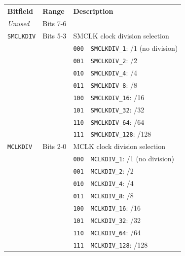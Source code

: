 \begin{tabularx}{\textwidth}{ l l l X }
\textbf{Bitfield} & \textbf{Range} & \multicolumn{2}{X}{\textbf{Description}} \\ \hline
\textit{Unused} & Bits 7-6 & \multicolumn{2}{X}{} \\
\hline
\texttt{SMCLKDIV} & Bits 5-3 & \multicolumn{2}{X}{SMCLK clock division selection} \\
 & & \texttt{000} & \texttt{SMCLKDIV\_1}: /1 (no division) \\
 & & \cellcolor{tablehighlightcolor}\texttt{001} & \cellcolor{tablehighlightcolor}\texttt{SMCLKDIV\_2}: /2 \\
 & & \texttt{010} & \texttt{SMCLKDIV\_4}: /4 \\
 & & \cellcolor{tablehighlightcolor}\texttt{011} & \cellcolor{tablehighlightcolor}\texttt{SMCLKDIV\_8}: /8 \\
 & & \texttt{100} & \texttt{SMCLKDIV\_16}: /16 \\
 & & \cellcolor{tablehighlightcolor}\texttt{101} & \cellcolor{tablehighlightcolor}\texttt{SMCLKDIV\_32}: /32 \\
 & & \texttt{110} & \texttt{SMCLKDIV\_64}: /64 \\
 & & \cellcolor{tablehighlightcolor}\texttt{111} & \cellcolor{tablehighlightcolor}\texttt{SMCLKDIV\_128}: /128 \\
\hline
\texttt{MCLKDIV} & Bits 2-0 & \multicolumn{2}{X}{MCLK clock division selection} \\
 & & \texttt{000} & \texttt{MCLKDIV\_1}: /1 (no division) \\
 & & \cellcolor{tablehighlightcolor}\texttt{001} & \cellcolor{tablehighlightcolor}\texttt{MCLKDIV\_2}: /2 \\
 & & \texttt{010} & \texttt{MCLKDIV\_4}: /4 \\
 & & \cellcolor{tablehighlightcolor}\texttt{011} & \cellcolor{tablehighlightcolor}\texttt{MCLKDIV\_8}: /8 \\
 & & \texttt{100} & \texttt{MCLKDIV\_16}: /16 \\
 & & \cellcolor{tablehighlightcolor}\texttt{101} & \cellcolor{tablehighlightcolor}\texttt{MCLKDIV\_32}: /32 \\
 & & \texttt{110} & \texttt{MCLKDIV\_64}: /64 \\
 & & \cellcolor{tablehighlightcolor}\texttt{111} & \cellcolor{tablehighlightcolor}\texttt{MCLKDIV\_128}: /128 \\
\hline
\end{tabularx}


